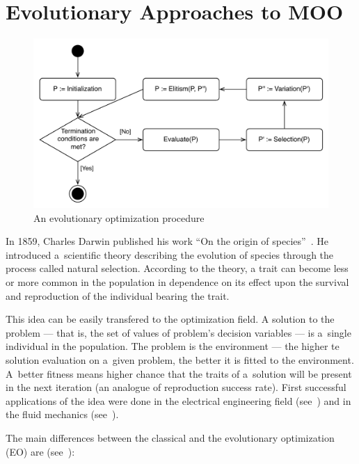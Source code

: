 \section{Evolutionary Approaches to MOO}
\label{sec_ea_in_moo}

\begin{figure}
  \centering \includegraphics[scale=0.65]{img/eo}
  \caption{An evolutionary optimization procedure}
  \label{eo}
\end{figure}

In 1859, Charles Darwin published his work ``On the origin of
species''~\cite{Dar1859}. He introduced a~scientific theory describing the
evolution of species through the process called natural selection.  According
to the theory, a trait can become less or more common in the population in
dependence on its effect upon the survival and reproduction of the individual
bearing the trait.

This idea can be easily transfered to the optimization field. A solution to
the problem --- that is, the set of values of problem's decision variables ---
is a~single individual in the population. The problem is the environment ---
the higher te solution evaluation on a~given problem, the better it is fitted
to the environment. A~better fitness means higher chance that the traits of
a~solution will be present in the next iteration (an analogue of reproduction
success rate). First successful applications of the idea were done in the
electrical engineering field (see~\cite{Fog64}) and in the fluid mechanics
(see~\cite{Rec65, Sch65}).

The main differences between the classical and the evolutionary optimization
(EO) are (see~\cite{Deb08}):

